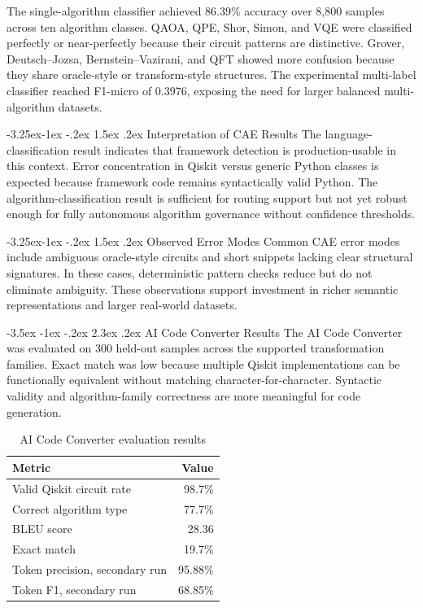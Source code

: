 \documentclass[12pt,a4paper]{report}
\makeatletter
\renewcommand\section{\@startsection{section}{1}{\z@}%
  {-3.5ex \@plus -1ex \@minus -.2ex}%
  {2.3ex \@plus.2ex}%
  {\normalfont\bfseries\fontsize{12pt}{16pt}\selectfont}}
\renewcommand\subsection{\@startsection{subsection}{2}{\z@}%
  {-3.25ex\@plus -1ex \@minus -.2ex}%
  {1.5ex \@plus .2ex}%
  {\normalfont\bfseries\fontsize{12pt}{16pt}\selectfont}}
\makeatother
\begin{document}
The single-algorithm classifier achieved 86.39\% accuracy over 8,800 samples across ten algorithm classes. QAOA, QPE, Shor, Simon, and VQE were classified perfectly or near-perfectly because their circuit patterns are distinctive. Grover, Deutsch--Jozsa, Bernstein--Vazirani, and QFT showed more confusion because they share oracle-style or transform-style structures. The experimental multi-label classifier reached F1-micro of 0.3976, exposing the need for larger balanced multi-algorithm datasets.

\subsection{Interpretation of CAE Results}
The language-classification result indicates that framework detection is production-usable in this context. Error concentration in Qiskit versus generic Python classes is expected because framework code remains syntactically valid Python. The algorithm-classification result is sufficient for routing support but not yet robust enough for fully autonomous algorithm governance without confidence thresholds.

\subsection{Observed Error Modes}
Common CAE error modes include ambiguous oracle-style circuits and short snippets lacking clear structural signatures. In these cases, deterministic pattern checks reduce but do not eliminate ambiguity. These observations support investment in richer semantic representations and larger real-world datasets.

\section{AI Code Converter Results}
The AI Code Converter was evaluated on 300 held-out samples across the supported transformation families. Exact match was low because multiple Qiskit implementations can be functionally equivalent without matching character-for-character. Syntactic validity and algorithm-family correctness are more meaningful for code generation.

\begin{table}[H]
\centering
\caption{AI Code Converter evaluation results}
\begin{tabular}{lr}
\toprule
\textbf{Metric} & \textbf{Value} \\
\midrule
Valid Qiskit circuit rate & 98.7\% \\
Correct algorithm type & 77.7\% \\
BLEU score & 28.36 \\
Exact match & 19.7\% \\
Token precision, secondary run & 95.88\% \\
Token F1, secondary run & 68.85\% \\
\bottomrule
\end{tabular}
\end{table}
\end{document}
